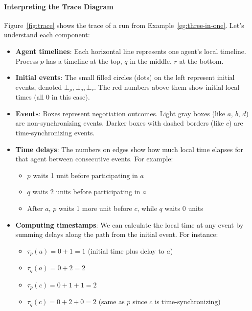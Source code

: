 \paragraph*{Interpreting the Trace Diagram}

Figure~\ref{fig:trace} shows the trace of a run from Example~\ref{eg:three-in-one}. Let's understand each component:

\begin{itemize}
\item \textbf{Agent timelines}: Each horizontal line represents one agent's local timeline. Process $p$ has a timeline at the top, $q$ in the middle, $r$ at the bottom.

\item \textbf{Initial events}: The small filled circles (dots) on the left represent initial events, denoted $\bot_p, \bot_q, \bot_r$. The red numbers above them show initial local times (all 0 in this case).

\item \textbf{Events}: Boxes represent negotiation outcomes. Light gray boxes (like $a$, $b$, $d$) are non-synchronizing events. Darker boxes with dashed borders (like $c$) are time-synchronizing events.

\item \textbf{Time delays}: The numbers on edges show how much local time elapses for that agent between consecutive events. For example:
  \begin{itemize}
  \item $p$ waits 1 unit before participating in $a$
  \item $q$ waits 2 units before participating in $a$
  \item After $a$, $p$ waits 1 more unit before $c$, while $q$ waits 0 units
  \end{itemize}

\item \textbf{Computing timestamps}: We can calculate the local time at any event by summing delays along the path from the initial event. For instance:
  \begin{itemize}
  \item $\tau_p(a) = 0 + 1 = 1$ (initial time plus delay to $a$)
  \item $\tau_q(a) = 0 + 2 = 2$
  \item $\tau_p(c) = 0 + 1 + 1 = 2$
  \item $\tau_q(c) = 0 + 2 + 0 = 2$ (same as $p$ since $c$ is time-synchronizing)
  \end{itemize}
\end{itemize}

